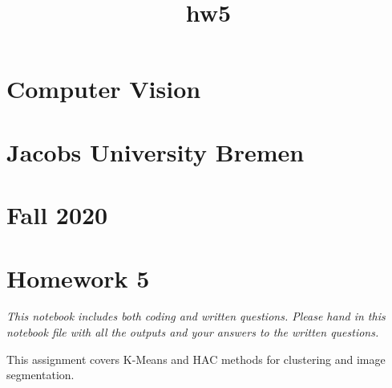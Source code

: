 \documentclass[11pt]{article}
\title{hw5}
\begin{document}
    
    
    \maketitle
    
    

    
    \section{Computer Vision}\label{computer-vision}

\section{Jacobs University Bremen}\label{jacobs-university-bremen}

\section{Fall 2020}\label{fall-2020}

\section{Homework 5}\label{homework-5}

\emph{This notebook includes both coding and written questions. Please
hand in this notebook file with all the outputs and your answers to the
written questions.}

This assignment covers K-Means and HAC methods for clustering and image
segmentation.
\end{document}

